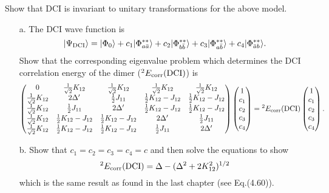 \documentclass[a4paper]{book}
\newcommand{\corr}{{\rm corr}}
\newcommand{\DCI}{{\rm DCI}}
\begin{document}
	\begin{exercise}
	Show that DCI is invariant to unitary transformations for the above model.
	\begin{enumerate}
	
	\item[a.] The DCI wave function is
	\[
		| \Psi_{\DCI} \rangle = | \Phi_0 \rangle + c_1 | \Phi^{**}_{a\bar{a}} \rangle + c_2 | \Phi^{**}_{b \bar{b}} \rangle + c_3 | \Phi^{**}_{a\bar{b}} \rangle + c_4 | \Phi^{**}_{\bar{a}b}\rangle.
	\]
	Show that the corresponding eigenvalue problem which determines the DCI correlation energy of the dimer (${}^{2}E_{\corr}(\DCI)$) is
	\[
	\begin{pmatrix}
		0 & \frac{1}{\sqrt{2}} K_{12} & \frac{1}{\sqrt{2}}K_{12} & \frac{1}{\sqrt{2}} K_{12} & \frac{1}{\sqrt{2}}K_{12} \\
		\frac{1}{\sqrt{2}}K_{12} & 2\Delta^\prime & \frac{1}{2}J_{11} & \frac{1}{2}K_{12} - J_{12} & \frac{1}{2}K_{12} - J_{12} \\
		\frac{1}{\sqrt{2}}K_{12} & \frac{1}{2}J_{11} & 2\Delta^\prime & \frac{1}{2}K_{12} - J_{12} & \frac{1}{2}K_{12} - J_{12} \\
		\frac{1}{\sqrt{2}}K_{12} & \frac{1}{2}K_{12} - J_{12} & \frac{1}{2}K_{12} - J_{12} & 2\Delta^\prime & \frac{1}{2}J_{11} \\
		\frac{1}{\sqrt{2}}K_{12} & \frac{1}{2}K_{12} - J_{12} & \frac{1}{2}K_{12} - J_{12} & \frac{1}{2}J_{11} & 2\Delta^\prime
	\end{pmatrix} \begin{pmatrix}
	1 \\ c_1 \\ c_2 \\ c_3 \\ c_4
	\end{pmatrix} = {}^2 E_\corr (\DCI) \begin{pmatrix}
	1 \\ c_1 \\ c_2 \\ c_3 \\ c_4
	\end{pmatrix}.
	\]
	
	\item[b.] Show that $c_1 = c_2 = c_3 = c_4 = c$ and then solve the equations to show
	\[
		{}^{2}E_\corr(\DCI) = \Delta - ( \Delta^2 + 2 K^2_{12} )^{1/2}
	\]
	which is the same result as found in the last chapter (see Eq.(4.60)).
	\end{enumerate}
	\end{exercise}
	
\end{document}
